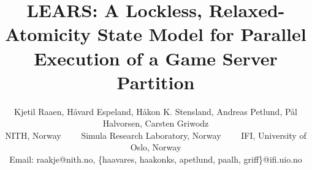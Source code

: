 \documentclass[conference]{IEEEtran}
\begin{document}
\title{LEARS: A Lockless, Relaxed-Atomicity State Model for Parallel Execution of a Game Server Partition}

\author{
  \large
  Kjetil Raaen, H{\aa}vard Espeland, H{\aa}kon K. Stensland,
  Andreas Petlund, P{\aa}l Halvorsen, Carsten Griwodz\\
  \large
  NITH, Norway \ \ \ \ Simula Research Laboratory, Norway \ \ \ \ 
  IFI, University of Oslo, Norway\\
  \large
  Email: raakje@nith.no, \{haavares, haakonks, apetlund, paalh, griff\}@ifi.uio.no
}


\maketitle










\newpage


\end{document}
